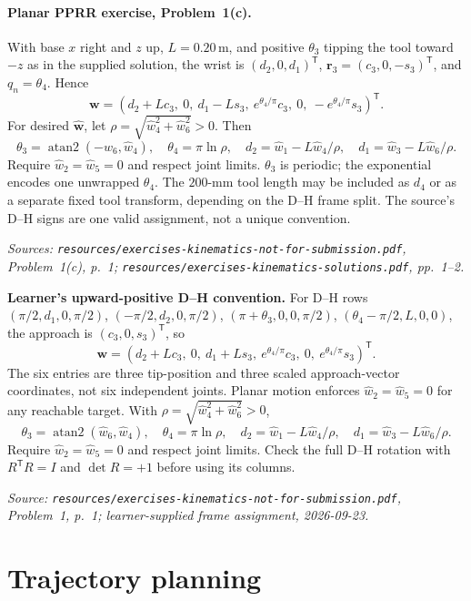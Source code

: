 \documentclass[11pt,a4paper]{article}
\renewcommand{\texttt}[1]{\nolinkurl{#1}}
\newcommand{\trans}{\mathsf{T}}
\begin{document}
\paragraph{Planar PPRR exercise, Problem~1(c).}
With base $x$ right and $z$ up, $L=0.20\,\mathrm m$, and positive $\theta_3$ tipping the tool toward $-z$ as in the supplied solution, the wrist is $(d_2,0,d_1)^\trans$, $\mathbf r_3=(c_3,0,-s_3)^\trans$, and $q_n=\theta_4$. Hence
\[
 \mathbf w=(d_2+Lc_3,\ 0,\ d_1-Ls_3,\ e^{\theta_4/\pi}c_3,\ 0,\ -e^{\theta_4/\pi}s_3)^\trans.
\]
For desired $\widehat{\mathbf w}$, let $\rho=\sqrt{\widehat w_4^2+\widehat w_6^2}>0$. Then
\[
 \theta_3=\operatorname{atan2}(-\widehat w_6,\widehat w_4),\quad
 \theta_4=\pi\ln\rho,\quad
 d_2=\widehat w_1-L\widehat w_4/\rho,\quad
 d_1=\widehat w_3-L\widehat w_6/\rho.
\]
Require $\widehat w_2=\widehat w_5=0$ and respect joint limits. $\theta_3$ is periodic; the exponential encodes one unwrapped $\theta_4$. The $200$-mm tool length may be included as $d_4$ or as a separate fixed tool transform, depending on the D--H frame split. The source's D--H signs are one valid assignment, not a unique convention.
\par\emph{Sources: \texttt{resources/exercises-kinematics-not-for-submission.pdf}, Problem~1(c), p.~1; \texttt{resources/exercises-kinematics-solutions.pdf}, pp.~1--2.}

\textbf{Learner's upward-positive D--H convention.} For D--H rows
$(\pi/2,d_1,0,\pi/2)$, $(-\pi/2,d_2,0,\pi/2)$,
$(\pi+\theta_3,0,0,\pi/2)$, $(\theta_4-\pi/2,L,0,0)$,
the approach is $(c_3,0,s_3)^\trans$, so
\[
 \mathbf w=(d_2+Lc_3,\ 0,\ d_1+Ls_3,\ e^{\theta_4/\pi}c_3,\ 0,\ e^{\theta_4/\pi}s_3)^\trans.
\]
The six entries are three tip-position and three scaled approach-vector
coordinates, not six independent joints. Planar motion enforces
$\widehat w_2=\widehat w_5=0$ for any reachable target.
With $\rho=\sqrt{\widehat w_4^2+\widehat w_6^2}>0$,
\[
 \theta_3=\operatorname{atan2}(\widehat w_6,\widehat w_4),\quad
 \theta_4=\pi\ln\rho,\quad
 d_2=\widehat w_1-L\widehat w_4/\rho,\quad
 d_1=\widehat w_3-L\widehat w_6/\rho.
\]
Require $\widehat w_2=\widehat w_5=0$ and respect joint limits. Check the
full D--H rotation with $R^\trans R=I$ and $\det R=+1$ before using its columns.
\par\emph{Source: \texttt{resources/exercises-kinematics-not-for-submission.pdf}, Problem~1, p.~1; learner-supplied frame assignment, 2026-09-23.}

\section{Trajectory planning}
\end{document}

